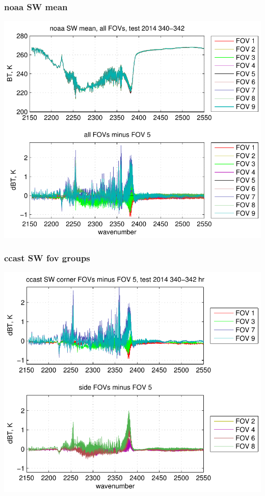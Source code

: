 \documentclass[11pt]{beamer}
\begin{document}
\begin{frame}
\frametitle{noaa SW mean}

\begin{center}
  \includegraphics[scale=0.7]{figures/noaa_SW_avg_2014_340-342.pdf}
\end{center}

\end{frame}
\begin{frame}
\frametitle{ccast SW fov groups}

\begin{center}
  \includegraphics[scale=0.7]{figures/ccast_SW_dif_2014_340-342_hr.pdf}
\end{center}

\end{frame}
\end{document}
